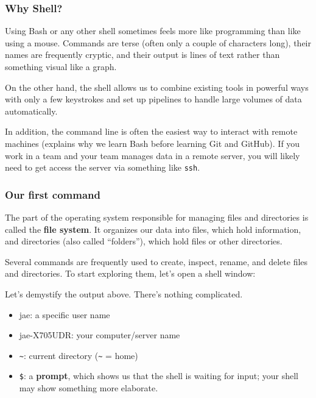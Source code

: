 \documentclass[
  letterpaper,
  DIV=11,
  numbers=noendperiod]{scrreprt}
\newenvironment{Shaded}{\begin{snugshade}}{\end{snugshade}}
\newcommand{\ExtensionTok}[1]{\textcolor[rgb]{0.00,0.23,0.31}{#1}}
\providecommand{\tightlist}{%
  \setlength{\itemsep}{0pt}\setlength{\parskip}{0pt}}\usepackage{longtable,booktabs,array}
\begin{document}
\hypertarget{why-shell}{%
\subsubsection*{Why Shell?}\label{why-shell}}

Using Bash or any other shell sometimes feels more like programming than
like using a mouse. Commands are terse (often only a couple of
characters long), their names are frequently cryptic, and their output
is lines of text rather than something visual like a graph.

On the other hand, the shell allows us to combine existing tools in
powerful ways with only a few keystrokes and set up pipelines to handle
large volumes of data automatically.

In addition, the command line is often the easiest way to interact with
remote machines (explains why we learn Bash before learning Git and
GitHub). If you work in a team and your team manages data in a remote
server, you will likely need to get access the server via something like
\texttt{ssh}.

\hypertarget{our-first-command}{%
\subsubsection*{Our first command}\label{our-first-command}}

The part of the operating system responsible for managing files and
directories is called the \textbf{file system}. It organizes our data
into files, which hold information, and directories (also called
``folders''), which hold files or other directories.

Several commands are frequently used to create, inspect, rename, and
delete files and directories. To start exploring them, let's open a
shell window:

\begin{Shaded}
\end{Shaded}

Let's demystify the output above. There's nothing complicated.

\begin{itemize}
\tightlist
\item
  jae: a specific user name
\item
  jae-X705UDR: your computer/server name
\item
  \texttt{\textasciitilde{}}: current directory
  (\texttt{\textasciitilde{}} = home)
\item
  \texttt{\$}: a \textbf{prompt}, which shows us that the shell is
  waiting for input; your shell may show something more elaborate.
\end{itemize}
\end{document}
